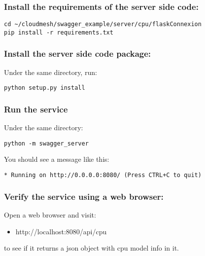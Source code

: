 \subsubsection{Install the requirements of the server side
code:}\label{install-the-requirements-of-the-server-side-code}

\begin{lstlisting}
cd ~/cloudmesh/swagger_example/server/cpu/flaskConnexion
pip install -r requirements.txt
\end{lstlisting}

\subsubsection{Install the server side code
package:}\label{install-the-server-side-code-package}

Under the same directory, run:

\begin{lstlisting}
python setup.py install
\end{lstlisting}

\subsubsection{Run the service}\label{run-the-service}

Under the same directory:

\begin{lstlisting}
python -m swagger_server
\end{lstlisting}

You should see a message like this:

\begin{lstlisting}
* Running on http://0.0.0.0:8080/ (Press CTRL+C to quit)
\end{lstlisting}

\subsubsection{Verify the service using a web
browser:}\label{verify-the-service-using-a-web-browser}

Open a web browser and visit:

\begin{itemize}
\tightlist
\item
  http://localhost:8080/api/cpu
\end{itemize}

to see if it returns a json object with cpu model info in it.

